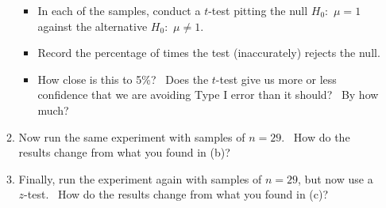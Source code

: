 \documentclass[11pt]{article}
\begin{document}
\begin{enumerate}
\begin{enumerate}
\begin{itemize}
\item In each of the samples, conduct a $t$-test pitting the null $H_{0}:$ $%
\mu =1$ against the alternative $H_{0}:$ $\mu \neq 1.$

\item Record the percentage of times the test (inaccurately) rejects the
null.

\item How close is this to 5\%? \ Does the $t$-test give us more or less
confidence that we are avoiding Type I error than it should? \ By how much?
\end{itemize}

\item Now run the same experiment with samples of $n=29.$ \ How do the
results change from what you found in (b)?

\item Finally, run the experiment again with samples of $n=29$, but now use
a $z$-test. \ How do the results change from what you found in (c)?
\end{enumerate}
\end{enumerate}
\end{document}
